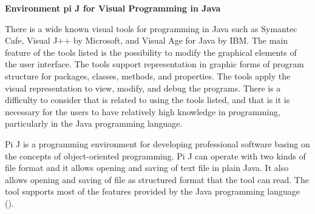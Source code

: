 \flushleft
\textbf{Environment pi J for Visual Programming in Java}\\
\justifying

\parx
There is a wide known visual tools for programming in Java such as Symantec
Cafe, Visual J++ by Microsoft, and Visual Age for Java by IBM. The main feature
of the tools listed is the possibility to modify the graphical elements of the
user interface. The tools support representation in graphic forms of program
structure for packages, classes, methods, and properties. The tools apply the
visual representation to view, modify, and debug the programs. There is a
difficulty to consider that is related to using the tools listed, and that is it
is necessary for the users to have relatively high knowledge in programming,
particularly in the Java programming language.

\parx
Pi J is a programming environment for developing professional software basing on
the concepts of object-oriented programming. Pi J can operate with two kinds of
file format and it allows opening and saving of text file in plain Java. It also
allows opening and saving of file as structured format that the tool can read.
The tool supports most of the features provided by the Java programming
language (\cite{prokhorov_kosarev}).
